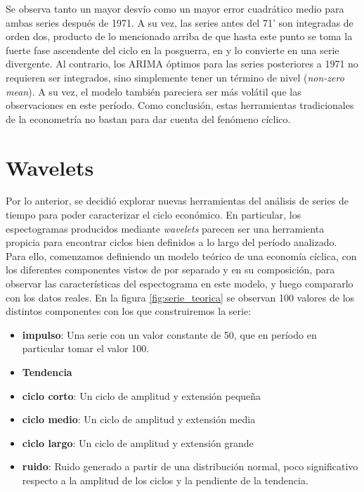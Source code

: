 \documentclass[a4paper]{article}
\begin{document}
Se observa tanto un mayor desvío como un mayor error cuadrático medio para ambas series después de 1971. A su vez, las series antes del 71' son integradas de orden dos, producto de lo mencionado arriba de que hasta este punto se toma la fuerte fase ascendente del ciclo en la posguerra, en y lo convierte en una serie divergente. Al contrario, los ARIMA óptimos para las series posteriores a 1971 no requieren ser integrados, sino simplemente tener un término de nivel (\textit{non-zero mean}). A su vez, el modelo también pareciera ser más volátil que las observaciones en este período. Como conclusión, estas herramientas tradicionales de la econometría no bastan para dar cuenta del fenómeno cíclico. 

\section{Wavelets}

Por lo anterior, se decidió explorar nuevas herramientas del análisis de series de tiempo para poder caracterizar el ciclo económico. En particular, los espectogramas producidos mediante \textit{wavelets} parecen ser una herramienta propicia para encontrar ciclos bien definidos a lo largo del período analizado. Para ello, comenzamos definiendo un modelo teórico de una economía cíclica, con los diferentes componentes vistos de por separado y en su composición, para observar las características del espectograma en este modelo,  y luego compararlo con los datos reales. 
En la figura \ref{fig:serie_teorica} se observan 100 valores de los distintos componentes con los que construiremos la serie:

\begin{itemize}
	\item \textbf{impulso}: Una serie con un valor constante de 50, que en período en particular tomar el valor 100.
	\item \textbf{Tendencia}
	\item \textbf{ciclo corto}: Un ciclo de amplitud y extensión pequeña
	\item \textbf{ciclo medio}: Un ciclo de amplitud y extensión media
	\item \textbf{ciclo largo}: Un ciclo de amplitud y extensión grande
	\item \textbf{ruido}: Ruido generado a partir de una distribución normal, poco significativo respecto a la amplitud de los ciclos y la pendiente de la tendencia.
\end{itemize}
\end{document}
